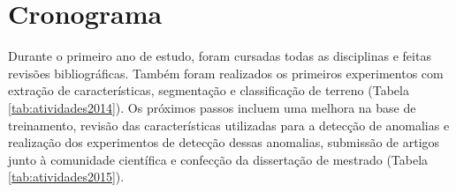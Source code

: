 \chapter{Cronograma}\label{cap:cronograma}

Durante o primeiro ano de estudo, foram cursadas todas as disciplinas e feitas revisões bibliográficas. Também foram realizados os primeiros experimentos com extração de características, segmentação e classificação de terreno (Tabela \ref{tab:atividades2014}). Os próximos passos incluem uma melhora na base de treinamento, revisão das características utilizadas para a detecção de anomalias e realização dos experimentos de detecção dessas anomalias, submissão de artigos junto à comunidade científica e confecção da dissertação de mestrado (Tabela \ref{tab:atividades2015}).

\begin{table}[h]
\caption{Atividades realizadas em 2014}
\label{tab:atividades2014}
\end{table}

\begin{table}[h]
\caption{Cronograma de atividades para 2015}
\label{tab:atividades2015}
\end{table}
